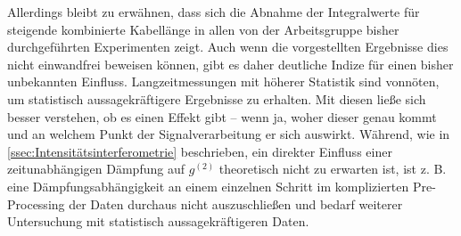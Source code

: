 Allerdings bleibt zu erwähnen, dass sich die Abnahme der Integralwerte für steigende kombinierte Kabellänge in allen von der Arbeitsgruppe bisher durchgeführten Experimenten zeigt. 
Auch wenn die vorgestellten Ergebnisse dies nicht einwandfrei beweisen können, gibt es daher deutliche Indize für einen bisher unbekannten Einfluss. 
Langzeitmessungen mit höherer Statistik sind vonnöten, um statistisch aussagekräftigere Ergebnisse zu erhalten. 
Mit diesen ließe sich besser verstehen, ob es einen Effekt gibt -- wenn ja, woher dieser genau kommt und an welchem Punkt der Signalverarbeitung er sich auswirkt. 
Während, wie in \autoref{ssec:Intensitätsinterferometrie} beschrieben, ein direkter Einfluss einer zeitunabhängigen Dämpfung auf $g^{(2)}$ theoretisch nicht zu erwarten ist, ist z. B. eine Dämpfungsabhängigkeit an einem einzelnen Schritt im komplizierten Pre-Processing der Daten durchaus nicht auszuschließen und bedarf weiterer Untersuchung mit statistisch aussagekräftigeren Daten. 


